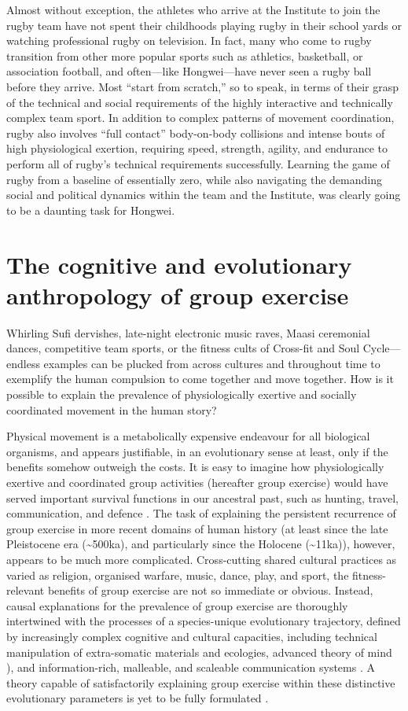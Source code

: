 Almost without exception, the athletes who arrive at the Institute to join the rugby team have not spent their childhoods playing rugby in their school yards or watching professional rugby on television.  In fact, many who come to rugby transition from other more popular sports such as athletics, basketball, or association football, and often---like Hongwei---have never seen a rugby ball before they arrive.  Most ``start from scratch,'' so to speak, in terms of their grasp of the technical and social requirements of the highly interactive and technically complex team sport. In addition to complex patterns of movement coordination, rugby also involves ``full contact'' body-on-body collisions and intense bouts of high physiological exertion, requiring speed, strength, agility, and endurance to perform all of rugby's technical requirements successfully.  Learning the game of rugby from a baseline of essentially zero, while also navigating the demanding social and political dynamics within the team and the Institute, was clearly going to be a daunting task for Hongwei.


\section{The cognitive and evolutionary anthropology of group exercise}
Whirling Sufi dervishes, late-night electronic music raves, Maasi ceremonial dances, competitive team sports, or the fitness cults of Cross-fit and Soul Cycle---endless examples can be plucked from across cultures and throughout time to exemplify the human compulsion to come together and move together.  How is it possible to explain the prevalence of physiologically exertive and socially coordinated movement in the human story?

Physical movement is a metabolically expensive endeavour for all biological organisms,  and appears justifiable, in an evolutionary sense at least, only if the benefits somehow outweigh the costs.  It is easy to imagine how physiologically exertive and coordinated group activities (hereafter group exercise) would have served important survival functions in our ancestral past, such as hunting, travel, communication, and defence \citep{Sands2010}.  The task of explaining the persistent recurrence of group exercise in more recent domains of human history (at least since the late Pleistocene era (\sim500ka), and particularly since the Holocene (\sim11ka)), however, appears to be much more complicated.  Cross-cutting shared cultural practices as varied as religion, organised warfare, music, dance, play, and sport, the fitness-relevant benefits of group exercise are not so immediate or obvious.  Instead, causal explanations for the prevalence of group exercise are thoroughly intertwined with the processes of a species-unique evolutionary trajectory, defined by increasingly complex cognitive and cultural capacities, including technical manipulation of extra-somatic materials and ecologies, advanced theory of mind \citep{Tomasello1999}), and information-rich, malleable, and scaleable communication systems \citep{Fuentes2016}.  A theory capable of satisfactorily explaining group exercise within these distinctive evolutionary parameters is yet to be fully formulated \citep{Cohen2017}.

